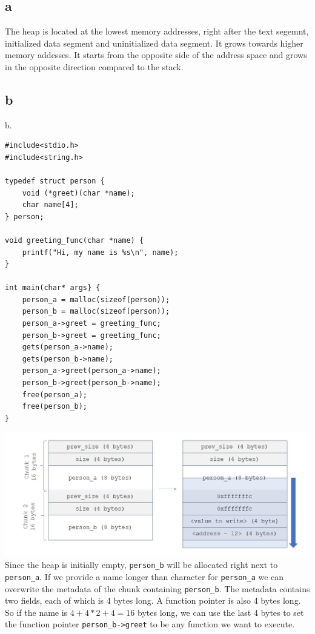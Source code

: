 \documentclass{article}
\begin{document}
\section{}
\subsection*{a}
The heap is located at the lowest memory addresses, right after the text segemnt, initialized data segment and uninitialized data segment. It grows towards higher memory addesses. It starts from the opposite side of the address space and grows in the opposite direction compared to the stack.
\subsection*{b}
b.
\begin{verbatim}
#include<stdio.h>
#include<string.h>

typedef struct person {
    void (*greet)(char *name);
    char name[4];
} person;

void greeting_func(char *name) {
    printf("Hi, my name is %s\n", name);
}

int main(char* args} {
    person_a = malloc(sizeof(person));
    person_b = malloc(sizeof(person));
    person_a->greet = greeting_func;
    person_b->greet = greeting_func;
    gets(person_a->name);
    gets(person_b->name);
    person_a->greet(person_a->name);
    person_b->greet(person_b->name);
    free(person_a);
    free(person_b);
}
\end{verbatim}
\includegraphics[width=\textwidth]{2b.jpg}\\
Since the heap is initially empty, \texttt{person\_b} will be allocated right next to \texttt{person\_a}. If we provide a name longer than  character for \texttt{person\_a} we can overwrite the metadata of the chunk containing \texttt{person\_b}. The metadata contains two fields, each of which is 4 bytes long. A function pointer is also 4 bytes long. So if the name is $4 + 4 * 2 + 4 = 16$ bytes long, we can use the last 4 bytes to set the function pointer \texttt{person\_b->greet} to be any function we want to execute. \\\\
\end{document}
